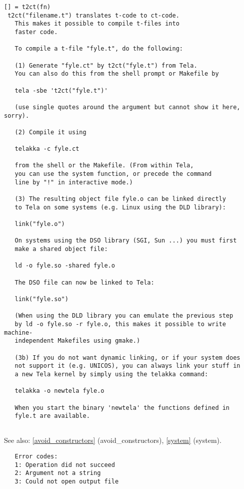 \documentclass[a4paper]{article}
\begin{document}
\begin{tscreen}
\begin{verbatim}
[] = t2ct(fn)
 t2ct("filename.t") translates t-code to ct-code.
   This makes it possible to compile t-files into
   faster code.

   To compile a t-file "fyle.t", do the following:

   (1) Generate "fyle.ct" by t2ct("fyle.t") from Tela.
   You can also do this from the shell prompt or Makefile by

   tela -sbe 't2ct("fyle.t")'

   (use single quotes around the argument but cannot show it here, sorry).
   
   (2) Compile it using

   telakka -c fyle.ct

   from the shell or the Makefile. (From within Tela,
   you can use the system function, or precede the command
   line by "!" in interactive mode.)

   (3) The resulting object file fyle.o can be linked directly
   to Tela on some systems (e.g. Linux using the DLD library):

   link("fyle.o")

   On systems using the DSO library (SGI, Sun ...) you must first
   make a shared object file:

   ld -o fyle.so -shared fyle.o

   The DSO file can now be linked to Tela:

   link("fyle.so")

   (When using the DLD library you can emulate the previous step
   by ld -o fyle.so -r fyle.o, this makes it possible to write machine-
   independent Makefiles using gmake.)

   (3b) If you do not want dynamic linking, or if your system does
   not support it (e.g. UNICOS), you can always link your stuff in
   a new Tela kernel by simply using the telakka command:

   telakka -o newtela fyle.o

   When you start the binary 'newtela' the functions defined in
   fyle.t are available.
   
\end{verbatim}

See also: \ref{avoid_constructors} {(avoid\_constructors)}, \ref{system} {(system)}.
\begin{verbatim}
   Error codes:
   1: Operation did not succeed
   2: Argument not a string
   3: Could not open output file
   
\end{verbatim}
\end{tscreen}
\end{document}
